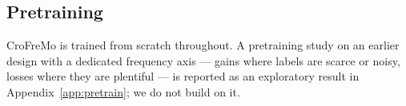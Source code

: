 \begin{table}[t]
\centering
\small
\caption{CroFreMo's tokenizer in place of the host's own, hosts trained
from scratch. Native rows are three-seed means except REVE from scratch
(single seed); transplants are single seeds. Cohen's $\kappa$; CHB-MIT
AUC-PR.}
\label{tab:hosts}
\end{table}

\subsection{Pretraining}
\label{sec:pretrain-results}

CroFreMo is trained from scratch throughout. A pretraining study on an
earlier design with a dedicated frequency axis --- gains where labels are
scarce or noisy, losses where they are plentiful --- is reported as an
exploratory result in Appendix~\ref{app:pretrain}; we do not build on it.
